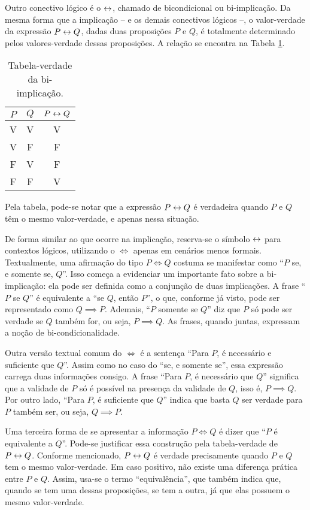 Outro conectivo lógico é o $\leftrightarrow$, chamado de bicondicional ou bi-implicação.
Da mesma forma que a implicação -- e os demais conectivos lógicos --, o valor-verdade da expressão $P \leftrightarrow Q$, dadas duas proposições $P$ e $Q$, é totalmente determinado pelos valores-verdade dessas proposições.
A relação se encontra na Tabela \ref{tbl:bi-implicacao}.

\begin{table}[h]
\caption{Tabela-verdade da bi-implicação.}
\label{tbl:bi-implicacao}
\centering
\begin{tabular}{ccc}
$P$		& $Q$		& $P \leftrightarrow Q$	\\ \hline
V		& V			& V			\\
V		& F			& F			\\
F		& V			& F			\\
F		& F			& V			\\	
\end{tabular}
\end{table}
%
\noindent Pela tabela, pode-se notar que a expressão $P \leftrightarrow Q$ é verdadeira quando $P$ e $Q$ têm o mesmo valor-verdade, e apenas nessa situação.

De forma similar ao que ocorre na implicação, reserva-se o símbolo $\leftrightarrow$ para contextos lógicos, utilizando o $\iff$ apenas em cenários menos formais.
Textualmente, uma afirmação do tipo $P \iff Q$ costuma se manifestar como ``$P$ se, e somente se, $Q$''. 
Isso começa a evidenciar um importante fato sobre a bi-implicação: ela pode ser definida como a conjunção de duas implicações.
A frase ``$P$ se $Q$'' é equivalente a ``se $Q$, então $P$'', o que, conforme já visto, pode ser representado como $Q \implies P$.
Ademais, ``$P$ somente se $Q$'' diz que $P$ só pode ser verdade se $Q$ também for, ou seja, $P \implies Q$. 
As frases, quando juntas, expressam a noção de bi-condicionalidade.

Outra versão textual comum do $\iff$ é a sentença ``Para $P$, é necessário e suficiente que $Q$''.
Assim como no caso do ``se, e somente se'', essa expressão carrega duas informações consigo.
A frase ``Para $P$, é necessário que $Q$'' significa que a validade de $P$ só é possível na presença da validade de $Q$, isso é, $P \implies Q$.
Por outro lado, ``Para $P$, é suficiente que $Q$'' indica que basta $Q$ ser verdade para $P$ também ser, ou seja, $Q \implies P$.

Uma terceira forma de se apresentar a informação $P \iff Q$ é dizer que ``$P$ é equivalente a $Q$''.
Pode-se justificar essa construção pela tabela-verdade de $P \leftrightarrow Q$. 
Conforme mencionado, $P \leftrightarrow Q$ é verdade precisamente quando $P$ e $Q$ tem o mesmo valor-verdade.
Em caso positivo, não existe uma diferença prática entre $P$ e $Q$.
Assim, usa-se o termo ``equivalência'', que também indica que, quando se tem uma dessas proposições, se tem a outra, já que elas possuem o mesmo valor-verdade.


